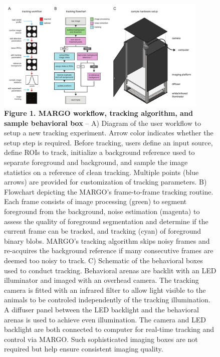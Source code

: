 \documentclass[10pt]{article}
\begin{document}
\newpage
\begin{figure}[h!]
	\begin{center}
		\includegraphics[width=0.9\textwidth]{../figures/autotracker_overview.pdf}
	\end{center}
	\caption*{\footnotesize \textbf{Figure 1. MARGO workflow, tracking algorithm, and sample behavioral box} -- A) Diagram of the user workflow to setup a new tracking experiment. Arrow color indicates whether the setup step is required. Before tracking, users define an input source, define ROIs to track, initialize a background reference used to separate foreground and background, and sample the image statistics on a reference of clean tracking. Multiple points (blue arrows) are provided for customization of tracking parameters. B) Flowchart depicting the MARGO's frame-to-frame tracking routine. Each frame consists of image processing (green) to segment foreground from the background, noise estimation (magenta) to assess the quality of foreground segmentation and determine if the current frame can be tracked, and tracking (cyan) of foreground binary blobs. MARGO's tracking algorithm skips noisy frames and re-acquires the background reference if many consecutive frames are deemed too noisy to track. C) Schematic of the behavioral boxes used to conduct tracking. Behavioral arenas are backlit with an LED illuminator and imaged with an overhead camera. The tracking camera is fitted with an infrared filter to allow light visible to the animals to be controled independently of the tracking illumination. A diffuser panel between the LED backlight and the behavioral arenas is used to achieve even illumination. The camera and LED backlight are both connected to computer for real-time tracking and control via MARGO. Such sophisticated imaging boxes are not required but help ensure consistent imaging quality.}
\end{figure}
\end{document}
